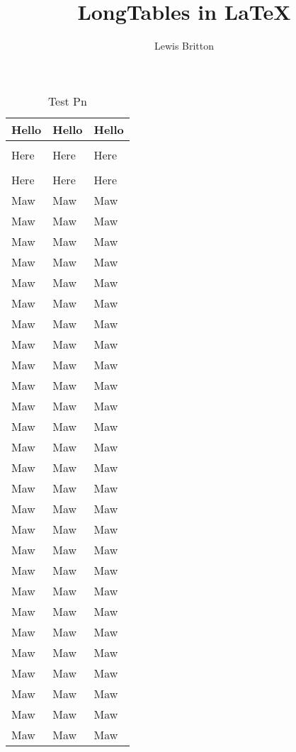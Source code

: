 \documentclass[a4, 11pt]{article}
\begin{document}
	\title{LongTables in {\LaTeX}}
	\author{Lewis Britton}
	\date{}
	\maketitle


	\begin{longtable}{ l l l }
		Hello & Hello & Hello \\
		\hline
		\caption{Test P1}\\
		\hline\hline
		Here & Here & Here\\
		\hline\hline
		\endfirsthead
		\caption[]{Test Pn}\\
		\hline\hline
		Here & Here & Here\\
		\hline\hline
		\endhead
		Maw & Maw & Maw\\
		Maw & Maw & Maw\\
		Maw & Maw & Maw\\
		Maw & Maw & Maw\\
		Maw & Maw & Maw\\
		Maw & Maw & Maw\\
		Maw & Maw & Maw\\
		Maw & Maw & Maw\\
		Maw & Maw & Maw\\
		Maw & Maw & Maw\\
		Maw & Maw & Maw\\
		Maw & Maw & Maw\\
		Maw & Maw & Maw\\
		Maw & Maw & Maw\\
		Maw & Maw & Maw\\
		Maw & Maw & Maw\\
		Maw & Maw & Maw\\
		Maw & Maw & Maw\\
                Maw & Maw & Maw\\
                Maw & Maw & Maw\\
                Maw & Maw & Maw\\
                Maw & Maw & Maw\\
                Maw & Maw & Maw\\
                Maw & Maw & Maw\\
                Maw & Maw & Maw\\
                Maw & Maw & Maw\\
                Maw & Maw & Maw\\

\end{longtable}
\end{document}
